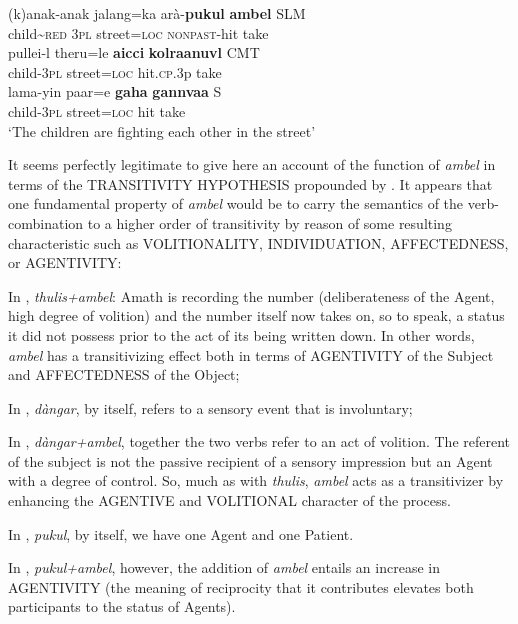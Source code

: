 \ea
\ea\label{jaffar:ex:20}
\gll (k)anak-anak jalang=ka arà-\textbf{pukul} \textbf{ambel} SLM \\
 child\~{}\textsc{red} 3\textsc{pl} street=\textsc{loc}  \textsc{nonpast}-hit take\\
\ex%
\gll pullei-{\E}l theru=le \textbf{a{\dz}icci} \textbf{kolraanuv{\E}l}  CMT \\
 child-3\textsc{pl} street=\textsc{loc}  hit.\textsc{cp}.3p take \\
\ex%
\gll lama-yin paar=e \textbf{gaha} \textbf{gann{\E}vaa}  S \\ 
 child-3\textsc{pl} street=\textsc{loc}  hit take\\
`The children are fighting each other in the street'
\z
\z

It seems perfectly legitimate to give here an account of the function of \textit{ambel} in terms of the TRANSITIVITY HYPOTHESIS propounded by \citet{HopperEtAl1980}. It appears that one fundamental property of \textit{ambel} would be to carry the semantics of the verb-combination to a higher order of transitivity by reason of some resulting characteristic such as VOLITIONALITY, INDIVIDUATION, AFFECTEDNESS, or AGENTIVITY:

In , \textit{thulis+ambel}: Amath is recording the number (deliberateness of the Agent, high degree of volition) and the number itself now takes on, so to speak, a status it did not possess prior to the act of its being written down. In other words, \textit{ambel} has a transitivizing effect both in terms of AGENTIVITY of the Subject and AFFECTEDNESS of the Object;

In , \textit{dàngar}, by itself, refers to a sensory event that is involuntary;

In , \textit{dàngar+ambel}, together the two verbs refer to an act of volition. The referent of the subject is not the passive recipient of a sensory impression but an Agent with a degree of control. So, much as with \textit{thulis}, \textit{ambel} acts as a transitivizer by enhancing the AGENTIVE and VOLITIONAL character of the process. 

In , \textit{pukul}, by itself, we have one Agent and one Patient.

In , \textit{pukul+ambel}, however, the addition of \textit{ambel} entails an increase in AGENTIVITY (the meaning of reciprocity that it contributes elevates both participants to the status of Agents). 

